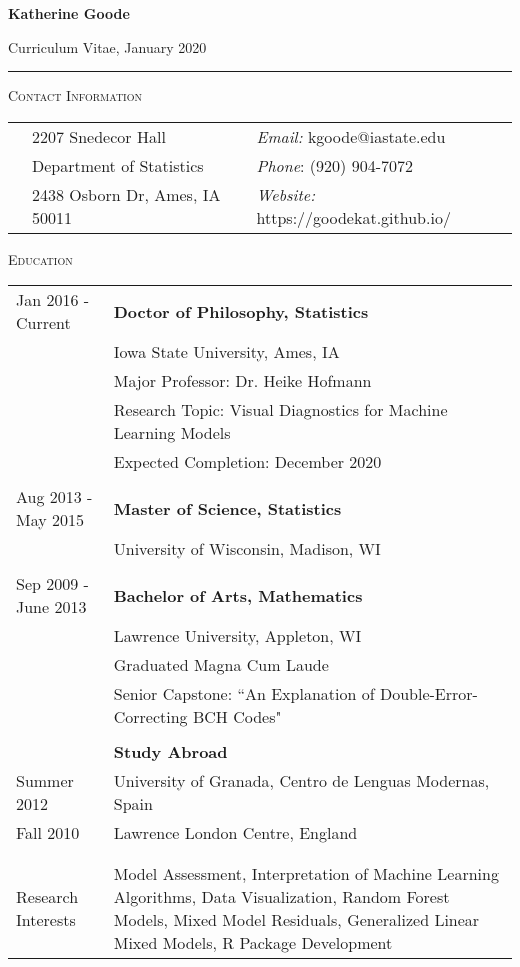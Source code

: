 \documentclass[10pt, oneside]{article}
\begin{document}
\begin{LARGE} \noindent\textbf{Katherine Goode} \end{LARGE} \hfill Curriculum Vitae, January 2020\\
\rule{\textwidth}{1pt}

\vspace{0.25cm}

\noindent \textsc{Contact Information} \hrulefill
\begin{longtable}{p{3.9cm}p{6.5cm}p{6.5cm}}
& 2207 Snedecor Hall & \emph{Email:} kgoode@iastate.edu\\
& Department of Statistics & \emph{Phone}: (920) 904-7072\\
& 2438 Osborn Dr, Ames, IA 50011 & \emph{Website:} https://goodekat.github.io/
\end{longtable}

\noindent \textsc{Education} \hrulefill
\begin{longtable}{p{3.5cm}p{13cm}}
\hfill{Jan 2016 - Current} & \textbf{Doctor of Philosophy, Statistics}\\
& Iowa State University, Ames, IA\\
& Major Professor: Dr. Heike Hofmann\\
& Research Topic: Visual Diagnostics for Machine Learning Models\\
& Expected Completion: December 2020\\
\\
\hfill{Aug 2013 - May 2015} & \textbf{Master of Science, Statistics}\\
& University of Wisconsin, Madison, WI\\
\\
\hfill{Sep 2009 - June 2013} & \textbf{Bachelor of Arts, Mathematics}\\
& Lawrence University, Appleton, WI\\
& Graduated Magna Cum Laude\\
& Senior Capstone: ``An Explanation of Double-Error-Correcting BCH Codes"\\
\\
& \textbf{Study Abroad}\\
\hfill{Summer 2012} & \indent University of Granada, Centro de Lenguas Modernas, Spain\\
\hfill{Fall 2010} & \indent Lawrence London Centre, England\\
\\
\\
\hfill{Research Interests} & Model Assessment, Interpretation of Machine Learning Algorithms, Data Visualization, Random Forest Models, Mixed Model Residuals, Generalized Linear Mixed Models, R Package Development\\
\end{longtable}
\end{document}
